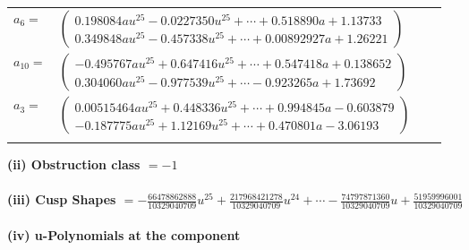 \documentclass[1p]{elsarticle_modified}
\theoremstyle{definition}
\begin{document}
\begin{tabular}{m{7pt} m{180pt} m{7pt} m{180pt} }
\flushright $a_{6}=$&$\begin{pmatrix}0.198084 a u^{25}-0.0227350 u^{25}+\cdots+0.518890 a+1.13733\\0.349848 a u^{25}-0.457338 u^{25}+\cdots+0.00892927 a+1.26221\end{pmatrix}$ \\
\flushright $a_{10}=$&$\begin{pmatrix}-0.495767 a u^{25}+0.647416 u^{25}+\cdots+0.547418 a+0.138652\\0.304060 a u^{25}-0.977539 u^{25}+\cdots-0.923265 a+1.73692\end{pmatrix}$ \\
\flushright $a_{3}=$&$\begin{pmatrix}0.00515464 a u^{25}+0.448336 u^{25}+\cdots+0.994845 a-0.603879\\-0.187775 a u^{25}+1.12169 u^{25}+\cdots+0.470801 a-3.06193\end{pmatrix}$\\&\end{tabular}
\flushleft \textbf{(ii) Obstruction class $= -1$}\\~\\
\flushleft \textbf{(iii) Cusp Shapes $= -\frac{66478862888}{10329040709} u^{25}+\frac{217968421278}{10329040709} u^{24}+\cdots-\frac{74797871360}{10329040709} u+\frac{51959996001}{10329040709}$}\\~\\
\newpage\renewcommand{\arraystretch}{1}
\flushleft \textbf{(iv) u-Polynomials at the component}\newline \\
\end{document}
